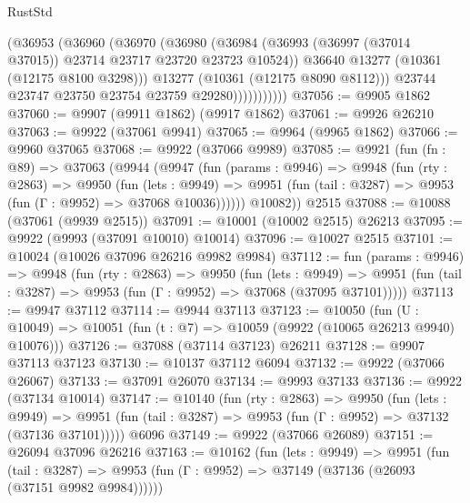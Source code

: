 \begin{lexlean}{RustStd}
\begin{coremodule}
                      (@36953
                        (@36960
                          (@36970
                            (@36980
                              (@36984
                                (@36993
                                  (@36997 (@37014 @37015))
                                  @23714
                                  @23717
                                  @23720
                                  @23723
                                  @10524))
                              @36640
                              @13277
                              (@10361 (@12175 @8100 @3298)))
                            @13277
                            (@10361 (@12175 @8090 @8112)))
                          @23744
                          @23747
                          @23750
                          @23754
                          @23759
                          @29280)))))))))))
@37056 := @9905 @1862
@37060 := @9907 (@9911 @1862) (@9917 @1862)
@37061 := @9926 @26210
@37063 := @9922 (@37061 @9941)
@37065 := @9964 (@9965 @1862)
@37066 := @9960 @37065
@37068 := @9922 (@37066 @9989)
@37085 := @9921
    (fun (fn : @89) =>
    @37063
      (@9944
        (@9947
          (fun (params : @9946) =>
          @9948
            (fun (rty : @2863) =>
            @9950
              (fun (lets : @9949) =>
              @9951 (fun (tail : @3287) => @9953 (fun (Γ : @9952) => @37068 @10036))))))
        @10082))
    @2515
@37088 := @10088 (@37061 (@9939 @2515))
@37091 := @10001 (@10002 @2515) @26213
@37095 := @9922 (@9993 (@37091 @10010) @10014)
@37096 := @10027 @2515
@37101 := @10024 (@10026 @37096 @26216 @9982 @9984)
@37112 := fun (params : @9946) =>
  @9948
    (fun (rty : @2863) =>
    @9950
      (fun (lets : @9949) =>
      @9951 (fun (tail : @3287) => @9953 (fun (Γ : @9952) => @37068 (@37095 @37101)))))
@37113 := @9947 @37112
@37114 := @9944 @37113
@37123 := @10050
    (fun (U : @10049) => @10051 (fun (t : @7) => @10059 (@9922 (@10065 @26213 @9940) @10076)))
@37126 := @37088 (@37114 @37123) @26211
@37128 := @9907 @37113 @37123
@37130 := @10137 @37112 @6094
@37132 := @9922 (@37066 @26067)
@37133 := @37091 @26070
@37134 := @9993 @37133
@37136 := @9922 (@37134 @10014)
@37147 := @10140
    (fun (rty : @2863) =>
    @9950
      (fun (lets : @9949) =>
      @9951 (fun (tail : @3287) => @9953 (fun (Γ : @9952) => @37132 (@37136 @37101)))))
    @6096
@37149 := @9922 (@37066 @26089)
@37151 := @26094 @37096 @26216
@37163 := @10162
    (fun (lets : @9949) =>
    @9951
      (fun (tail : @3287) =>
      @9953 (fun (Γ : @9952) => @37149 (@37136 (@26093 (@37151 @9982 @9984))))))

\end{coremodule}
\end{lexlean}
